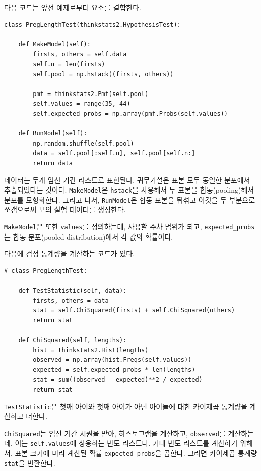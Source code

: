 다음 코드는 앞선 예제로부터 요소를 결합한다.


\begin{verbatim}
class PregLengthTest(thinkstats2.HypothesisTest):

    def MakeModel(self):
        firsts, others = self.data
        self.n = len(firsts)
        self.pool = np.hstack((firsts, others))

        pmf = thinkstats2.Pmf(self.pool)
        self.values = range(35, 44)
        self.expected_probs = np.array(pmf.Probs(self.values))

    def RunModel(self):
        np.random.shuffle(self.pool)
        data = self.pool[:self.n], self.pool[self.n:]
        return data
\end{verbatim}

데이터는 두개 임신 기간 리스트로 표현된다. 귀무가설은
표본 모두 동일한 분포에서 추출되었다는 것이다.
{\tt MakeModel}은 {\tt hstack}을 사용해서 두 표본을 합동(pooling)해서 분포를 모형화한다. 그리고 나서, {\tt RunModel}은 합동 표본을 뒤섞고 이것을 두 부분으로 쪼갬으로써 모의 실험 데이터를 생성한다.

{\tt MakeModel}은 또한 {\tt values}를 정의하는데, 사용할 주차 범위가 되고, 
\verb"expected_probs"는 합동 분포(pooled distribution)에서 각 값의 확률이다.

다음에 검정 통계량을 계산하는 코드가 있다.

\begin{verbatim}
# class PregLengthTest:

    def TestStatistic(self, data):
        firsts, others = data
        stat = self.ChiSquared(firsts) + self.ChiSquared(others)
        return stat

    def ChiSquared(self, lengths):
        hist = thinkstats2.Hist(lengths)
        observed = np.array(hist.Freqs(self.values))
        expected = self.expected_probs * len(lengths)
        stat = sum((observed - expected)**2 / expected)
        return stat
\end{verbatim}

{\tt TestStatistic}은 첫째 아이와 첫째 아이가 아닌 아이들에 대한 카이제곱 통계량을 계산하고 더한다.

{\tt ChiSquared}는 임신 기간 시퀀을 받아, 히스토그램을 계산하고,
{\tt observed}를 계산하는데, 이는 {\tt self.values}에 상응하는 빈도 리스트다. 기대 빈도 리스트를 계산하기 위해서, 표본 크기에 미리 계산된 확률 \verb"expected_probs"을 곱한다. 그러면 카이제곱 통계량 {\tt stat}을 반환한다.

